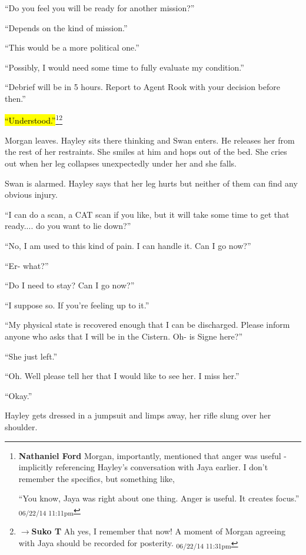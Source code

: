 ``Do you feel you will be ready for another mission?''

``Depends on the kind of mission.''

``This would be a more political one.''

``Possibly, I would need some time to fully evaluate my condition.''

``Debrief will be in 5 hours.  Report to Agent Rook with your decision before then.''

\hl{``Understood.''}\footnote{\textbf{Nathaniel Ford }Morgan, importantly, mentioned that anger was useful - implicitly referencing Hayley's conversation with Jaya earlier. I don't remember the specifics, but something like,

``You know, Jaya was right about one thing. Anger is useful. It creates focus.'' \textsubscript{06/22/14 11:11pm}}\footnote{$\rightarrow$\textbf{Suko T }Ah yes, I remember that now!  A moment of Morgan agreeing with Jaya should be recorded for posterity. \textsubscript{06/22/14 11:31pm}}



Morgan leaves.  Hayley sits there thinking and Swan enters.  He releases her from the rest of her restraints.  She smiles at him and hops out of the bed.  She cries out when her leg collapses unexpectedly under her and she falls.

Swan is alarmed.  Hayley says that her leg hurts but neither of them can find any obvious injury.

``I can do a scan, a CAT scan if you like, but it will take some time to get that ready.... do you want to lie down?''

``No, I am used to this kind of pain.  I can handle it.  Can I go now?''

``Er- what?''

``Do I need to stay?  Can I go now?''

``I suppose so.  If you're feeling up to it.''

``My physical state is recovered enough that I can be discharged.  Please inform anyone who asks that I will be in the Cistern.  Oh- is Signe here?''

``She just left.''

``Oh.  Well please tell her that I would like to see her.  I miss her.''

``Okay.''

Hayley gets dressed in a jumpsuit and limps away, her rifle slung over her shoulder.




